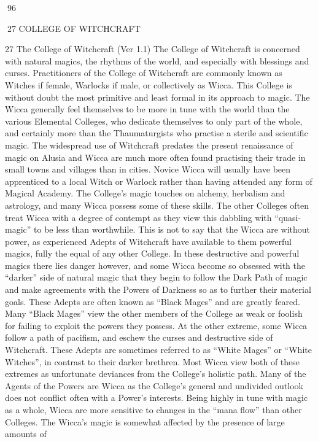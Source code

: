 \documentclass[a4paper]{article}
\begin{document}
\begin{multicols}{3}
96

27 COLLEGE OF WITCHCRAFT

27 The College of Witchcraft (Ver 1.1)
The College of Witchcraft is concerned with natural magics, the rhythms of the world, and especially with blessings and curses. Practitioners of
the College of Witchcraft are commonly known as
Witches if female, Warlocks if male, or collectively as Wicca. This College is without doubt the
most primitive and least formal in its approach to
magic. The Wicca generally feel themselves to be
more in tune with the world than the various Elemental Colleges, who dedicate themselves to only
part of the whole, and certainly more than the
Thaumaturgists who practise a sterile and scientific
magic. The widespread use of Witchcraft predates
the present renaissance of magic on Alusia and
Wicca are much more often found practising their
trade in small towns and villages than in cities.
Novice Wicca will usually have been apprenticed
to a local Witch or Warlock rather than having
attended any form of Magical Academy.
The College’s magic touches on alchemy, herbalism and astrology, and many Wicca possess some
of these skills. The other Colleges often treat
Wicca with a degree of contempt as they view this
dabbling with “quasi-magic” to be less than
worthwhile. This is not to say that the Wicca are
without power, as experienced Adepts of Witchcraft have available to them powerful magics, fully
the equal of any other College. In these destructive
and powerful magics there lies danger however,
and some Wicca become so obsessed with the
“darker” side of natural magic that they begin to
follow the Dark Path of magic and make agreements with the Powers of Darkness so as to further
their material goals. These Adepts are often known
as “Black Mages” and are greatly feared. Many
“Black Mages” view the other members of the
College as weak or foolish for failing to exploit the
powers they possess. At the other extreme, some
Wicca follow a path of pacifism, and eschew the
curses and destructive side of Witchcraft. These
Adepts are sometimes referred to as “White
Mages” or “White Witches”, in contrast to their
darker brethren. Most Wicca view both of these
extremes as unfortunate deviances from the College’s holistic path. Many of the Agents of the
Powers are Wicca as the College’s general and
undivided outlook does not conflict often with a
Power’s interests.
Being highly in tune with magic as a whole, Wicca
are more sensitive to changes in the “mana flow”
than other Colleges. The Wicca’s magic is somewhat affected by the presence of large amounts of

\end{multicols}
\end{document}
